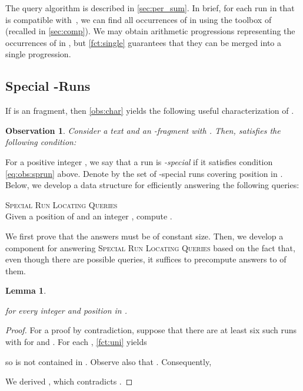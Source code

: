 \documentclass[a4paper]{article}
\newtheorem{lemma}[theorem]{Lemma}
\newtheorem{observation}[theorem]{Observation}
\theoremstyle{definition}
\theoremstyle{remark}
\newenvironment{dsproblem}[1]
{\begin{center}\begin{lrbox}{\mybox}\begin{minipage}{0.96\columnwidth}{\textsc{#1}}\\}
{\end{minipage}\end{lrbox}\fbox{\usebox{\mybox}}\end{center}}
\newcommand{\defdsproblem}[2]{
  \begin{dsproblem}{#1}
#2
  \end{dsproblem}
  }
\begin{document}
 The query algorithm is described in \cref{sec:per_sum}.
 In brief, for each run  in  that is compatible with~, we can find all occurrences of  in  using the toolbox of~\cite{DBLP:journals/tcs/CrochemoreIKRRW14} (recalled in \cref{sec:comp}).
 We may obtain  arithmetic progressions representing the occurrences of  in ,
 but \cref{fct:single} guarantees that they can be merged into a single progression.


\subsection{Special -Runs}\label{sec:finder}
If  is an  fragment, then \cref{obs:char} yields the following useful characterization of .

\begin{observation}
Consider a text  and an -fragment  with . 
Then,  satisfies the following condition:

\end{observation} 

For a positive integer , we say that a run  is \emph{-special} if 
it satisfies condition \eqref{eq:obs:sprun} above.
Denote by  the set of -special runs covering position  in .
Below, we develop a data structure for efficiently answering the following queries:

\defdsproblem{\textsc{Special Run Locating Queries}}{
Given a position  of  and an integer , 
compute .
}

We first prove that the answers must be of constant size. Then, we develop a component for answering \textsc{Special Run Locating Queries} based on the fact that, even though there are  possible queries, it suffices to precompute answers to  of them.
\begin{lemma}\label{lem:atmost5}
 
for every integer  and position  in .
\end{lemma}
\begin{proof}
For a proof by contradiction, suppose that there are at least six such runs 
with  for  and .
For each , \cref{fct:uni} yields 

 so  is not contained in .
Observe also that .
Consequently, 

We derived , which contradicts .
\end{proof}
\end{document}
